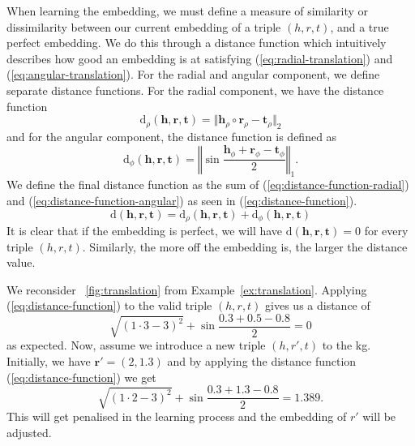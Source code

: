 When learning the embedding, we must define a measure of similarity or dissimilarity between our current embedding of a triple $(h, r, t)$, and a true perfect embedding.
We do this through a distance function which intuitively describes how good an embedding is at satisfying (\ref{eq:radial-translation}) and (\ref{eq:angular-translation}).
For the radial and angular component, we define separate distance functions.
For the radial component, we have the distance function
\begin{equation}\label{eq:distance-function-radial}
  \text{d}_\rho(\bm{h}, \bm{r}, \bm{t}) = \Vert \bm{h}_\rho \circ \bm{r}_\rho - \bm{t}_\rho \Vert_2
\end{equation}
and for the angular component, the distance function is defined as
\begin{equation}\label{eq:distance-function-angular}
  \text{d}_\phi(\bm{h}, \bm{r}, \bm{t}) = \left\Vert \sin \frac{\bm{h}_\phi + \bm{r}_\phi - \bm{t}_\phi}{2} \right\Vert_1.
\end{equation}
We define the final distance function as the sum of (\ref{eq:distance-function-radial}) and (\ref{eq:distance-function-angular}) as seen in (\ref{eq:distance-function}).
\begin{equation}\label{eq:distance-function}
  \text{d}(\bm{h}, \bm{r}, \bm{t}) = \text{d}_\rho(\bm{h}, \bm{r}, \bm{t}) + \text{d}_\phi(\bm{h}, \bm{r}, \bm{t})
\end{equation}
It is clear that if the embedding is perfect, we will have $\text{d}(\bm{h}, \bm{r}, \bm{t}) = 0$ for every triple $(h, r, t)$.
Similarly, the more off the embedding is, the larger the distance value.

\begin{example}
  We reconsider \figurename~\ref{fig:translation} from Example~\ref{ex:translation}.
  Applying (\ref{eq:distance-function}) to the valid triple $(h, r, t)$ gives us a distance of
  \[\sqrt{{(1 \cdot 3 - 3)}^2} + \sin \frac{0.3 + 0.5 - 0.8}{2} = 0\]
  as expected.
  Now, assume we introduce a new triple $(h, r', t)$ to the \ac{kg}.
  Initially, we have $\bm{r'} = (2, 1.3)$ and by applying the distance function (\ref{eq:distance-function}) we get
  \[\sqrt{{(1 \cdot 2 - 3)}^2} + \sin \frac{0.3 + 1.3 - 0.8}{2} = 1.389.\]
  This will get penalised in the learning process and the embedding of $r'$ will be adjusted.
\end{example}
